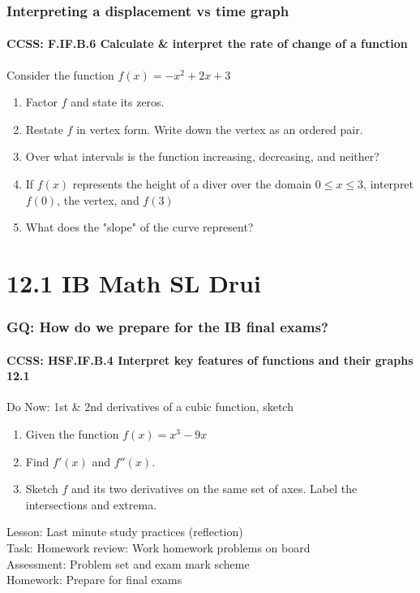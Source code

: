 \documentclass{beamer}
\begin{document}
  \frame
  {
    \frametitle{Interpreting a displacement vs time graph}
    \framesubtitle{CCSS: F.IF.B.6 Calculate \& interpret the rate of change of a function}

    \begin{block}{Consider the function $f(x)=-x^2+2x+3$}
    \begin{enumerate}
        \item Factor $f$ and state its zeros.
        \item Restate $f$ in vertex form. Write down the vertex as an ordered pair.
        \item Over what intervals is the function increasing, decreasing, and neither?
        \item If $f(x)$ represents the height of a diver over the domain $0 \leq x \leq 3$, interpret $f(0)$, the vertex, and $f(3)$
        \item What does the "slope" of the curve represent?
    \end{enumerate}
    \end{block}
  }

  \section{12.1 IB Math SL Drui}
  \frame
  {
    \frametitle{GQ: How do we prepare for the IB final exams?}
    \framesubtitle{CCSS: HSF.IF.B.4 Interpret key features of functions and their graphs \qquad \alert{12.1}}

    \begin{block}{Do Now: 1st \& 2nd derivatives of a cubic function, sketch}
      \begin{enumerate}
      \item Given the function $f(x)=x^3-9x$
      \item Find $f'(x)$ and $f''(x)$.
      \item Sketch $f$ and its two derivatives on the same set of axes. Label the intersections and extrema.
      \end{enumerate}
   \end{block}
    Lesson: Last minute study practices (reflection) \\[5pt]
    Task: Homework review: Work homework problems on board\\%
    Assessment: Problem set and exam mark scheme\\%
    Homework: Prepare for final exams
  }
\end{document}
